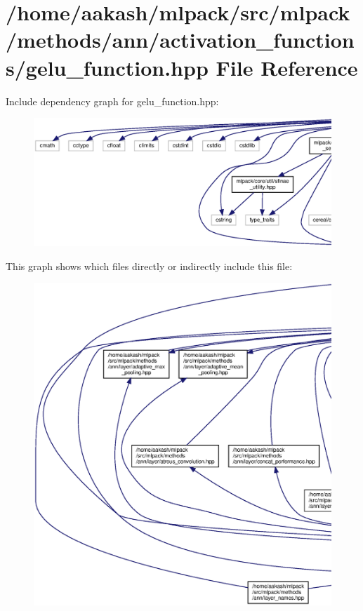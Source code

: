 \section{/home/aakash/mlpack/src/mlpack/methods/ann/activation\+\_\+functions/gelu\+\_\+function.hpp File Reference}
\label{gelu__function_8hpp}
Include dependency graph for gelu\+\_\+function.\+hpp\+:
\nopagebreak
\begin{figure}[H]
\begin{center}
\leavevmode
\includegraphics[width=350pt]{gelu__function_8hpp__incl}
\end{center}
\end{figure}
This graph shows which files directly or indirectly include this file\+:
\nopagebreak
\begin{figure}[H]
\begin{center}
\leavevmode
\includegraphics[width=350pt]{gelu__function_8hpp__dep__incl}
\end{center}
\end{figure}
